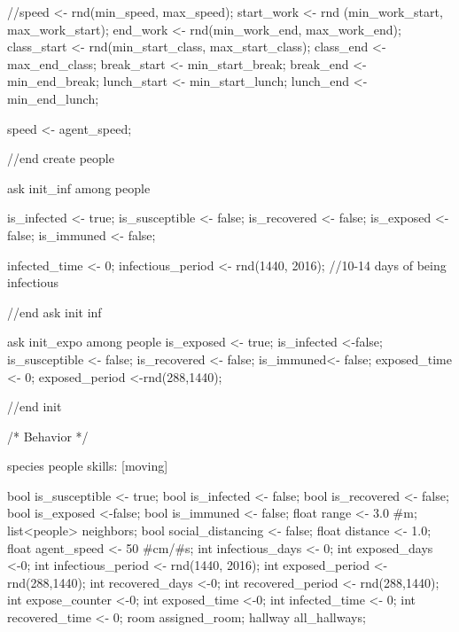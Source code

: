 \begin{verbatimtab}[4]
{{{                   
                   //speed <- rnd(min_speed, max_speed);
                start_work <- rnd (min_work_start, max_work_start);
                end_work <- rnd(min_work_end, max_work_end);
                class_start <- rnd(min_start_class, max_start_class);
                class_end <- max_end_class;
                break_start <- min_start_break;
                break_end <- min_end_break;
                lunch_start <- min_start_lunch;
                lunch_end <- min_end_lunch;
                
                speed <- agent_speed;
                
            }//end create people 
            
            ask init_inf among people {
               is_infected <- true;
               is_susceptible <- false;
               is_recovered <- false;
               is_exposed <-false;   
               is_immuned <- false;  
               
               infected_time <- 0;
               infectious_period <- rnd(1440, 2016); //10-14 days of being infectious
            }//end ask init inf   
            
            ask init_expo among people{
                is_exposed <- true;
                is_infected <-false;
                is_susceptible <- false;
                is_recovered <- false;
                is_immuned<- false;
                exposed_time <- 0;
                exposed_period <-rnd(288,1440); 
            }
            
       }//end init 
       
    /* Behavior  */
    
        species people skills: [moving] {
            bool is_susceptible <- true;
            bool is_infected <- false;
            bool is_recovered <- false;
            bool is_exposed <-false;
            bool is_immuned <- false;
            float range <- 3.0 #m;
            list<people> neighbors;
            bool social_distancing <- false;
            float distance <- 1.0;
            float agent_speed <- 50 #cm/#s;
            int infectious_days <- 0;
            int exposed_days <-0;
            int infectious_period <- rnd(1440, 2016);
            int exposed_period <- rnd(288,1440);
            int recovered_days <-0;
            int recovered_period <- rnd(288,1440);
            int expose_counter <-0;
            int exposed_time <-0;
            int infected_time <- 0;
            int recovered_time <- 0;
            room assigned_room;
            hallway all_hallways;
            
}}
\end{verbatimtab}
